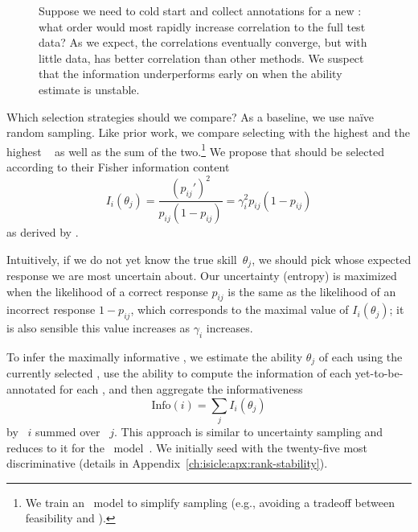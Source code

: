 \begin{figure}[t]
    \centering
    \caption{
        Suppose we need to cold start and collect annotations for a new \subj{}: what order would most rapidly increase correlation to the full test data?
        As we expect, the correlations eventually converge, but with little data, \irt{} has better correlation than other methods.
        We suspect that the \irt{} information underperforms early on
        when the \subj{} ability estimate is unstable.
    }
    \label{fig:stability:sampling}
\end{figure}


Which \itm{} selection strategies should we compare?
As a baseline, we use na\"ive random sampling.
Like prior work, we compare selecting \itms{} with the highest \diff{} and the highest \discability{}~\citep{lalor2019latent} as well as the sum of the two.\footnote{We train an ~model to simplify sampling (e.g., avoiding a tradeoff between feasibility and \discability{}).}
We propose that \itms{} should be selected according to their Fisher information content~\citep{weiss1982info}
\begin{equation}
    \label{eq:info}
    I_i(\theta_j)=\frac{(p_{ij}')^2}{p_{ij}(1-p_{ij})}=\gamma_i^2 p_{ij}(1-p_{ij})
\end{equation} as derived by \citet[p. 70]{lord1968test}.

Intuitively, if we do not yet know the true skill~$\theta_j$, we should pick \itms{} whose expected response we are most uncertain about.
Our uncertainty (entropy) is maximized when the likelihood of a correct response $p_{ij}$ is the same as the likelihood of an incorrect response $1-p_{ij}$, which corresponds to the maximal value of $I_i(\theta_j)$; it is also sensible this value increases as \discability{} $\gamma_i$ increases.

To infer the maximally informative \itms{}, we estimate the ability
$\theta_j$ of each \subj{} using the currently selected \itms{}, use
the ability to compute the information
of each yet-to-be-annotated \itm{} for each \subj{}, and then aggregate the informativeness
\begin{equation}
    \text{Info}(i)=\sum_j I_i(\theta_j)
\end{equation}
by \itm{}~$i$ summed over \subjs{}~$j$.
This approach is similar to uncertainty sampling and reduces to it for the ~model~\citep{lewis1994uncertainty}.
We initially seed with the twenty-five most discriminative \itms{} (details in Appendix~\ref{ch:isicle:apx:rank-stability}).

